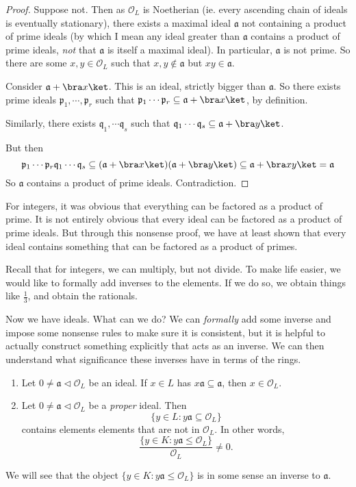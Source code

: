 \documentclass[a4paper]{article}
\begin{document}
\begin{proof}
  Suppose not. Then as $\mathcal{O}_L$ is Noetherian (ie. every ascending chain of ideals is eventually stationary), there exists a maximal ideal $\mathfrak{a}$ not containing a product of prime ideals (by which I mean any ideal greater than $\mathfrak{a}$ contains a product of prime ideals, \emph{not} that $\mathfrak{a}$ is itself a maximal ideal). In particular, $\mathfrak{a}$ is not prime. So there are some $x,y \in \mathcal{O}_L$ such that $x, y \not\in \mathfrak{a}$ but $xy \in \mathfrak{a}$.

  Consider $\mathfrak{a} + \bra x\ket$. This is an ideal, strictly bigger than $\mathfrak{a}$. So there exists prime ideals $\mathfrak{p}_1, \cdots, \mathfrak{p}_r$ such that $\mathfrak{p}_1\cdots \mathfrak{p}_r \subseteq \mathfrak{a} + \bra x\ket$, by definition.

  Similarly, there exists $\mathfrak{q}_1, \cdots\mathfrak{q}_s$ such that $\mathfrak{q}_1 \cdots \mathfrak{q}_s \subseteq \mathfrak{a} + \bra y\ket$.

  But then
  \[
    \mathfrak{p}_1\cdots\mathfrak{p}_r \mathfrak{q}_1\cdots\mathfrak{q}_s \subseteq (\mathfrak{a} + \bra x\ket)(\mathfrak{a} + \bra y\ket) \subseteq \mathfrak{a} + \bra xy\ket = \mathfrak{a}
  \]
  So $\mathfrak{a}$ contains a product of prime ideals. Contradiction.
\end{proof}
For integers, it was obvious that everything can be factored as a product of prime. It is not entirely obvious that every ideal can be factored as a product of prime ideals. But through this nonsense proof, we have at least shown that every ideal contains something that can be factored as a product of primes.

Recall that for integers, we can multiply, but not divide. To make life easier, we would like to formally add inverses to the elements. If we do so, we obtain things like $\frac{1}{3}$, and obtain the rationals.

Now we have ideals. What can we do? We can \emph{formally} add some inverse and impose some nonsense rules to make sure it is consistent, but it is helpful to actually construct something explicitly that acts as an inverse. We can then understand what significance these inverses have in terms of the rings.

\begin{prop}\leavevmode
  \begin{enumerate}
    \item Let $0 \not= \mathfrak{a} \lhd \mathcal{O}_L$ be an ideal. If $x \in L$ has $x\mathfrak{a} \subseteq \mathfrak{a}$, then $x \in \mathcal{O}_L$.
    \item Let $0 \not= \mathfrak{a} \lhd \mathcal{O}_L$ be a \emph{proper} ideal. Then
      \[
        \{y \in L: y \mathfrak{a} \subseteq \mathcal{O}_L\}
      \]
      contains elements elements that are not in $\mathcal{O}_L$. In other words,
      \[
        \frac{\{y \in K: y \mathfrak{a} \leq \mathcal{O}_L\}}{\mathcal{O}_L} \not = 0.
      \]
  \end{enumerate}
\end{prop}
We will see that the object $\{y \in K: y \mathfrak{a} \leq \mathcal{O}_L\}$ is in some sense an inverse to $\mathfrak{a}$.
\end{document}
